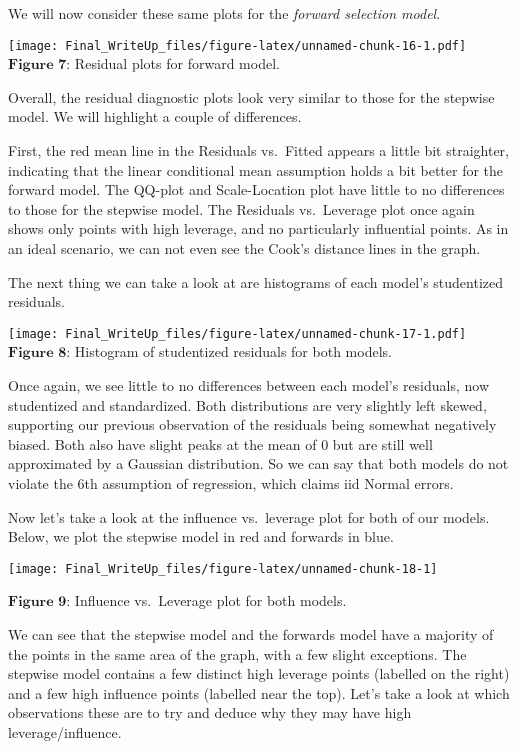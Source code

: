 \documentclass[]{article}
\begin{document}
We will now consider these same plots for the \emph{forward selection
model}.

\texttt{[image: Final\_WriteUp\_files/figure-latex/unnamed-chunk-16-1.pdf]}
\(\textbf{Figure 7}\): Residual plots for forward model.

Overall, the residual diagnostic plots look very similar to those for
the stepwise model. We will highlight a couple of differences.

First, the red mean line in the Residuals vs.~Fitted appears a little
bit straighter, indicating that the linear conditional mean assumption
holds a bit better for the forward model. The QQ-plot and Scale-Location
plot have little to no differences to those for the stepwise model. The
Residuals vs.~Leverage plot once again shows only points with high
leverage, and no particularly influential points. As in an ideal
scenario, we can not even see the Cook's distance lines in the graph.

The next thing we can take a look at are histograms of each model's
studentized residuals.

\texttt{[image: Final\_WriteUp\_files/figure-latex/unnamed-chunk-17-1.pdf]}
\(\textbf{Figure 8}\): Histogram of studentized residuals for both
models.

Once again, we see little to no differences between each model's
residuals, now studentized and standardized. Both distributions are very
slightly left skewed, supporting our previous observation of the
residuals being somewhat negatively biased. Both also have slight peaks
at the mean of 0 but are still well approximated by a Gaussian
distribution. So we can say that both models do not violate the 6th
assumption of regression, which claims iid Normal errors.

Now let's take a look at the influence vs.~leverage plot for both of our
models. Below, we plot the stepwise model in red and forwards in blue.

\begin{center}\texttt{[image: Final\_WriteUp\_files/figure-latex/unnamed-chunk-18-1]} \end{center}

\(\textbf{Figure 9}\): Influence vs.~Leverage plot for both models.

We can see that the stepwise model and the forwards model have a
majority of the points in the same area of the graph, with a few slight
exceptions. The stepwise model contains a few distinct high leverage
points (labelled on the right) and a few high influence points (labelled
near the top). Let's take a look at which observations these are to try
and deduce why they may have high leverage/influence.
\end{document}
